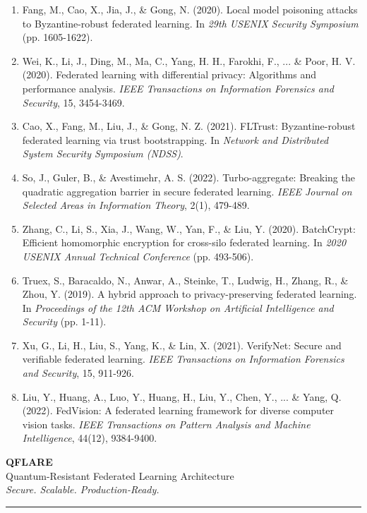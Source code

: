 \documentclass[12pt,a4paper]{article}
\begin{document}
\begin{enumerate}
    \item Fang, M., Cao, X., Jia, J., \& Gong, N. (2020). Local model poisoning attacks to Byzantine-robust federated learning. In \textit{29th USENIX Security Symposium} (pp. 1605-1622).
    
    \item Wei, K., Li, J., Ding, M., Ma, C., Yang, H. H., Farokhi, F., ... \& Poor, H. V. (2020). Federated learning with differential privacy: Algorithms and performance analysis. \textit{IEEE Transactions on Information Forensics and Security}, 15, 3454-3469.
    
    \item Cao, X., Fang, M., Liu, J., \& Gong, N. Z. (2021). FLTrust: Byzantine-robust federated learning via trust bootstrapping. In \textit{Network and Distributed System Security Symposium (NDSS)}.
    
    \item So, J., Guler, B., \& Avestimehr, A. S. (2022). Turbo-aggregate: Breaking the quadratic aggregation barrier in secure federated learning. \textit{IEEE Journal on Selected Areas in Information Theory}, 2(1), 479-489.
    
    \item Zhang, C., Li, S., Xia, J., Wang, W., Yan, F., \& Liu, Y. (2020). BatchCrypt: Efficient homomorphic encryption for cross-silo federated learning. In \textit{2020 USENIX Annual Technical Conference} (pp. 493-506).
    
    \item Truex, S., Baracaldo, N., Anwar, A., Steinke, T., Ludwig, H., Zhang, R., \& Zhou, Y. (2019). A hybrid approach to privacy-preserving federated learning. In \textit{Proceedings of the 12th ACM Workshop on Artificial Intelligence and Security} (pp. 1-11).
    
    \item Xu, G., Li, H., Liu, S., Yang, K., \& Lin, X. (2021). VerifyNet: Secure and verifiable federated learning. \textit{IEEE Transactions on Information Forensics and Security}, 15, 911-926.
    
    \item Liu, Y., Huang, A., Luo, Y., Huang, H., Liu, Y., Chen, Y., ... \& Yang, Q. (2022). FedVision: A federated learning framework for diverse computer vision tasks. \textit{IEEE Transactions on Pattern Analysis and Machine Intelligence}, 44(12), 9384-9400.
\end{enumerate}

\vspace{2cm}

\begin{center}
\Large
\textbf{QFLARE}\\
\normalsize
Quantum-Resistant Federated Learning Architecture\\
\textit{Secure. Scalable. Production-Ready.}\\[1cm]
\textcolor{qflareblue}{\rule{0.5\textwidth}{0.4pt}}
\end{center}
\end{document}
